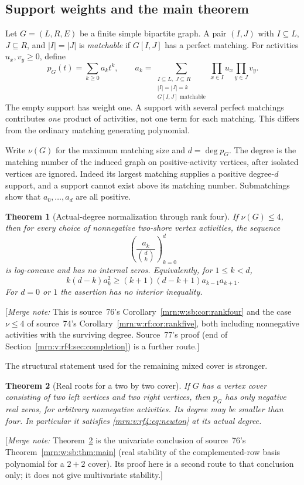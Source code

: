 \documentclass[11pt,a4paper]{article}
\newtheorem{theorem}{Theorem}[section]
\theoremstyle{remark}\newtheorem{remark}[theorem]{Remark}
\newcommand{\mnote}[1]{[\textit{Merge note:} #1]}
\begin{document}
\subsection{Support weights and the main theorem}
Let $G=(L,R,E)$ be a finite simple bipartite graph. A pair $(I,J)$ with $I\subseteq L$, $J\subseteq R$, and $|I|=|J|$ is \emph{matchable} if $G[I,J]$ has a perfect matching. For activities $u_x,v_y\ge0$, define
\begin{equation}\label{mrn:v:rf4:eq:support}
p_G(t)=\sum_{k\ge0}a_kt^k,
\qquad
a_k=\sum_{\substack{I\subseteq L,\ J\subseteq R\\|I|=|J|=k\\G[I,J]\text{ matchable}}}
\prod_{x\in I}u_x\prod_{y\in J}v_y.
\end{equation}
The empty support has weight one. A support with several perfect matchings contributes \emph{one} product of activities, not one term for each matching. This differs from the ordinary matching generating polynomial.

Write $\nu(G)$ for the maximum matching size and $d=\deg p_G$. The degree is the matching number of the induced graph on positive-activity vertices, after isolated vertices are ignored. Indeed its largest matching supplies a positive degree-$d$ support, and a support cannot exist above its matching number. Submatchings show that $a_0,\ldots,a_d$ are all positive.
\begin{theorem}[Actual-degree normalization through rank four]\label{mrn:v:rf4:thm:main}
If $\nu(G)\le4$, then for every choice of nonnegative two-shore vertex activities, the sequence
\[
\left(\frac{a_k}{\binom d k}\right)_{k=0}^d
\]
is log-concave and has no internal zeros. Equivalently, for $1\le k<d$,
\begin{equation}\label{mrn:v:rf4:eq:newton}
k(d-k)a_k^2\ge(k+1)(d-k+1)a_{k-1}a_{k+1}.
\end{equation}
For $d=0$ or $1$ the assertion has no interior inequality.
\end{theorem}
\mnote{This is source~76's Corollary~\ref{mrn:w:sb:cor:rankfour} and the
case $\nu\le4$ of source~74's Corollary~\ref{mrn:w:rf:cor:rankfive}, both
including nonnegative activities with the surviving degree. Source~77's proof
(end of Section~\ref{mrn:v:rf4:sec:completion}) is a further route.}


The structural statement used for the remaining mixed cover is stronger.
\begin{theorem}[Real roots for a two by two cover]\label{mrn:v:rf4:thm:mixed}
If $G$ has a vertex cover consisting of two left vertices and two right vertices, then $p_G$ has only negative real zeros, for arbitrary nonnegative activities. Its degree may be smaller than four. In particular it satisfies \eqref{mrn:v:rf4:eq:newton} at its actual degree.
\end{theorem}
\mnote{Theorem~\ref{mrn:v:rf4:thm:mixed} is the univariate conclusion of
source~76's Theorem~\ref{mrn:w:sb:thm:main} (real stability of the
complemented-row basis polynomial for a $2+2$ cover). Its proof here is a
second route to that conclusion only; it does not give multivariate
stability.}
\end{document}
